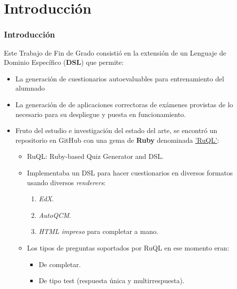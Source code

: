 \documentclass{beamer}
\begin{document}
\section{Introducción}
\begin{frame}[allowframebreaks]
  \frametitle{Introducción}
  
  \begin{center}
    Este Trabajo de Fin de Grado consistió en la extensión de un Lenguaje de Dominio Específico ({\bfseries DSL}) que permite:
    \begin{itemize}
       \item  La generación de cuestionarios autoevaluables para entrenamiento del alumnado 
       \item  La generación de de aplicaciones correctoras de exámenes
       provistas de lo necesario para su despliegue y puesta en funcionamiento.
    \end{itemize}
  \end{center}
  \framebreak
  
  \begin{itemize}
    \item Fruto del estudio e investigación del estado del arte, se encontró un repositorio en GitHub con una gema de {\bfseries Ruby} denominada 
    \href{http://github.com/saasbook/ruql}{'RuQL'}:
    \begin{itemize}
      \item RuQL: Ruby-based Quiz Generator and DSL.
      \item Implementaba un DSL para hacer cuestionarios en diversos formatos usando diversos \textit{renderers}:
      \begin{enumerate}
        \item \textit{EdX}.
        \item \textit{AutoQCM}.
        \item \textit{HTML impreso} para completar a mano.
      \end{enumerate}
      \item Los tipos de preguntas soportados por RuQL en ese momento eran: 
      \begin{itemize}
        \item De completar.
        \item De tipo test (respuesta única y multirrespuesta).
      \end{itemize}
    \end{itemize}
  \end{itemize}
  \framebreak
  

\end{frame}
\end{document}
